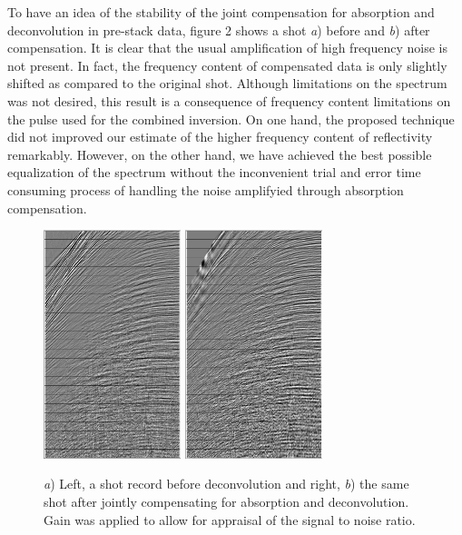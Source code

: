 \documentclass[twoside,letterpaper,twocolumn]{article}
\begin{document}
To have an idea of the stability of the joint compensation for absorption and deconvolution
in pre-stack data, figure 2 shows a shot \textit{a}) before and \textit{b}) after 
compensation. It is clear that the usual amplification of high frequency noise is not 
present. In fact, the frequency content of compensated data is only slightly shifted as 
compared to the original shot. Although limitations on the spectrum was not desired, this 
result is a consequence of frequency content limitations on the pulse used for the combined 
inversion. On one hand, the proposed technique did not improved our estimate of the higher frequency 
content of reflectivity remarkably. However, on the other hand, we have achieved the 
best possible equalization of the spectrum without the inconvenient trial and error 
time consuming process of handling the noise amplifyied through absorption compensation.

\begin{figure}[h!]
  \includegraphics[width=4cm]{images/tiro_original.png}
 \includegraphics[width=4cm]{images/Filtro_tiro.png}
 \caption[Figure 2]{\textit{a}) Left, a shot record before deconvolution and right, 
  \textit{b}) the same shot after jointly compensating for absorption and deconvolution. Gain was 
  applied to allow for appraisal of the signal to noise ratio.}
\end{figure}
\end{document}
